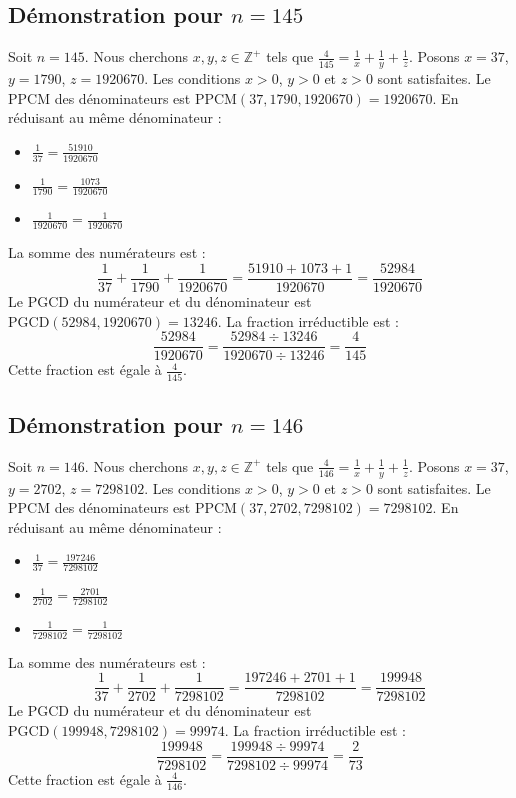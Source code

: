 \documentclass[11pt,a4paper]{article}
\begin{document}
\subsection{Démonstration pour $n = 145$}
Soit $n = 145$. Nous cherchons $x, y, z \in \mathbb{Z}^{+}$ tels que $\frac{4}{145} = \frac{1}{x} + \frac{1}{y} + \frac{1}{z}$.
Posons $x = 37$, $y = 1790$, $z = 1920670$.
Les conditions $x > 0$, $y > 0$ et $z > 0$ sont satisfaites.
Le PPCM des dénominateurs est $\text{PPCM}(37, 1790, 1920670) = 1920670$.
En réduisant au même dénominateur :
\begin{itemize}
    \item $\frac{1}{37} = \frac{51910}{1920670}$
    \item $\frac{1}{1790} = \frac{1073}{1920670}$
    \item $\frac{1}{1920670} = \frac{1}{1920670}$
\end{itemize}
La somme des numérateurs est :
$$ \frac{1}{37} + \frac{1}{1790} + \frac{1}{1920670} = \frac{51910 + 1073 + 1}{1920670} = \frac{52984}{1920670} $$
Le PGCD du numérateur et du dénominateur est $\text{PGCD}(52984, 1920670) = 13246$.
La fraction irréductible est :
$$ \frac{52984}{1920670} = \frac{52984 \div 13246}{1920670 \div 13246} = \frac{4}{145} $$
Cette fraction est égale à $\frac{4}{145}$.

\subsection{Démonstration pour $n = 146$}
Soit $n = 146$. Nous cherchons $x, y, z \in \mathbb{Z}^{+}$ tels que $\frac{4}{146} = \frac{1}{x} + \frac{1}{y} + \frac{1}{z}$.
Posons $x = 37$, $y = 2702$, $z = 7298102$.
Les conditions $x > 0$, $y > 0$ et $z > 0$ sont satisfaites.
Le PPCM des dénominateurs est $\text{PPCM}(37, 2702, 7298102) = 7298102$.
En réduisant au même dénominateur :
\begin{itemize}
    \item $\frac{1}{37} = \frac{197246}{7298102}$
    \item $\frac{1}{2702} = \frac{2701}{7298102}$
    \item $\frac{1}{7298102} = \frac{1}{7298102}$
\end{itemize}
La somme des numérateurs est :
$$ \frac{1}{37} + \frac{1}{2702} + \frac{1}{7298102} = \frac{197246 + 2701 + 1}{7298102} = \frac{199948}{7298102} $$
Le PGCD du numérateur et du dénominateur est $\text{PGCD}(199948, 7298102) = 99974$.
La fraction irréductible est :
$$ \frac{199948}{7298102} = \frac{199948 \div 99974}{7298102 \div 99974} = \frac{2}{73} $$
Cette fraction est égale à $\frac{4}{146}$.
\end{document}
